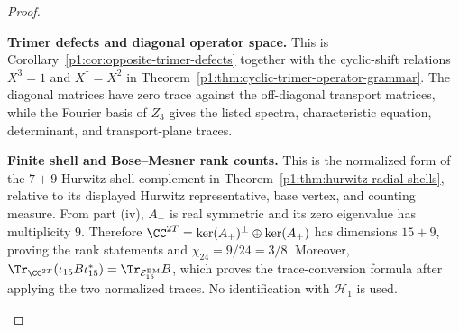 \documentclass[11pt]{article}
\begin{document}
\begin{proof}
\begin{proofsteps}[label=\textbf{(\roman*)}]
\item \textbf{Trimer defects and diagonal operator space.}
This is Corollary~\ref{p1:cor:opposite-trimer-defects} together with the
cyclic-shift relations \(X^3=1\) and \(X^\dagger=X^2\) in
Theorem~\ref{p1:thm:cyclic-trimer-operator-grammar}. The diagonal matrices have
zero trace against the off-diagonal transport matrices, while the Fourier basis
of \(Z_3\) gives the listed spectra, characteristic equation, determinant, and
transport-plane traces.

\item \textbf{Finite shell and Bose--Mesner rank counts.}
This is the normalized form of the \(7+9\) Hurwitz-shell complement in
Theorem~\ref{p1:thm:hurwitz-radial-shells}, relative to its displayed Hurwitz
representative, base vertex, and counting measure.  From part
\textup{(iv)}, \(A_+\) is real symmetric and its zero eigenvalue has
multiplicity \(9\).  Therefore
\(\CC^{2T}=\ker(A_+)^\perp\oplus\ker(A_+)\) has dimensions \(15+9\), proving
the rank statements and \(\chi_{24}=9/24=3/8\).  Moreover,
\(\Tr_{\CC^{2T}}(\iota_{15}B\iota_{15}^*)
=\Tr_{\mathcal E_{15}^{\rm BM}}B\), which proves the
trace-conversion formula after applying the two normalized traces.  No identification with \(\mathcal H_1\) is used.
\end{proofsteps}
\end{proof}
\end{document}
